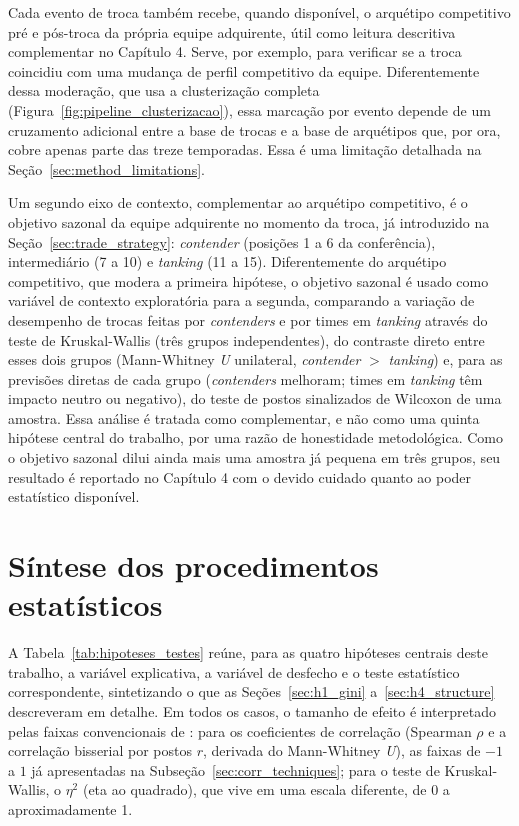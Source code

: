 Cada evento de troca também recebe, quando disponível, o arquétipo competitivo pré e pós-troca da própria equipe adquirente, útil como leitura descritiva complementar no Capítulo 4. Serve, por exemplo, para verificar se a troca coincidiu com uma mudança de perfil competitivo da equipe. Diferentemente dessa moderação, que usa a clusterização completa (Figura~\ref{fig:pipeline_clusterizacao}), essa marcação por evento depende de um cruzamento adicional entre a base de trocas e a base de arquétipos que, por ora, cobre apenas parte das treze temporadas. Essa é uma limitação detalhada na Seção~\ref{sec:method_limitations}.

Um segundo eixo de contexto, complementar ao arquétipo competitivo, é o objetivo sazonal da equipe adquirente no momento da troca, já introduzido na Seção~\ref{sec:trade_strategy}: \textit{contender} (posições 1 a 6 da conferência), intermediário (7 a 10) e \textit{tanking} (11 a 15). Diferentemente do arquétipo competitivo, que modera a primeira hipótese, o objetivo sazonal é usado como variável de contexto exploratória para a segunda, comparando a variação de desempenho de trocas feitas por \textit{contenders} e por times em \textit{tanking} através do teste de Kruskal-Wallis (três grupos independentes), do contraste direto entre esses dois grupos (Mann-Whitney \textit{U} unilateral, \textit{contender} $>$ \textit{tanking}) e, para as previsões diretas de cada grupo (\textit{contenders} melhoram; times em \textit{tanking} têm impacto neutro ou negativo), do teste de postos sinalizados de Wilcoxon de uma amostra. Essa análise é tratada como complementar, e não como uma quinta hipótese central do trabalho, por uma razão de honestidade metodológica. Como o objetivo sazonal dilui ainda mais uma amostra já pequena em três grupos, seu resultado é reportado no Capítulo 4 com o devido cuidado quanto ao poder estatístico disponível.

\section{Síntese dos procedimentos estatísticos}
\label{sec:stats_synthesis}

A Tabela~\ref{tab:hipoteses_testes} reúne, para as quatro hipóteses centrais deste trabalho, a variável explicativa, a variável de desfecho e o teste estatístico correspondente, sintetizando o que as Seções~\ref{sec:h1_gini} a~\ref{sec:h4_structure} descreveram em detalhe. Em todos os casos, o tamanho de efeito é interpretado pelas faixas convencionais de \citet{cohen1988}: para os coeficientes de correlação (Spearman $\rho$ e a correlação bisserial por postos $r$, derivada do Mann-Whitney \textit{U}), as faixas de $-1$ a $1$ já apresentadas na Subseção~\ref{sec:corr_techniques}; para o teste de Kruskal-Wallis, o $\eta^2$ (eta ao quadrado), que vive em uma escala diferente, de 0 a aproximadamente 1.

